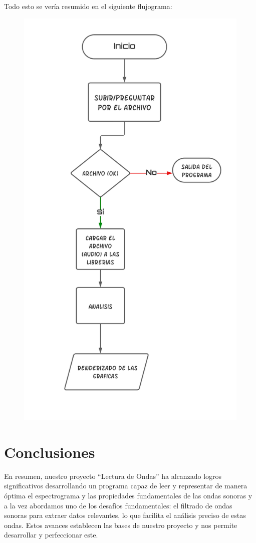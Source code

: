 \documentclass[letterpaper, 12pt]{article}
\begin{document}
Todo esto se vería resumido en el siguiente flujograma:

\begin{figure}[H]
	\begin{center}
		\includegraphics[width=.6\linewidth]{./Images/Flujograma.png}
		\caption{}
	\end{center}
\end{figure}

\section*{Conclusiones}

En resumen, nuestro proyecto ``Lectura de Ondas'' ha
alcanzado logros significativos desarrollando un programa
capaz de leer y representar de manera óptima el
espectrograma y las propiedades fundamentales de las ondas
sonoras y a la vez abordamos uno de los desafíos
fundamentales: el filtrado de ondas sonoras para extraer
datos relevantes, lo que facilita el análisis preciso de
estas ondas. Estos avances establecen las bases de nuestro
proyecto y nos permite desarrollar y perfeccionar este.

\nocite{source_code}

\printbibliography
\end{document}
